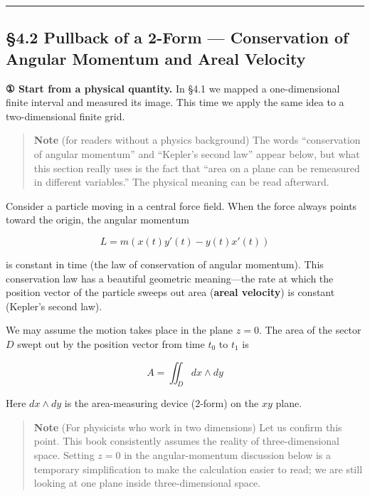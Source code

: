 \begin{center}\rule{0.5\linewidth}{0.5pt}\end{center}

\hypertarget{pullback-of-a-2-form-conservation-of-angular-momentum-and-areal-velocity}{%
\subsection{§4.2 Pullback of a 2-Form --- Conservation of Angular
Momentum and Areal
Velocity}\label{pullback-of-a-2-form-conservation-of-angular-momentum-and-areal-velocity}}

\textbf{① Start from a physical quantity.} In §4.1 we mapped a
one-dimensional finite interval and measured its image. This time we
apply the same idea to a two-dimensional finite grid.

\begin{quote}
\textbf{Note} (for readers without a physics background) The words
``conservation of angular momentum'' and ``Kepler's second law'' appear
below, but what this section really uses is the fact that ``area on a
plane can be remeasured in different variables.'' The physical meaning
can be read afterward.
\end{quote}

Consider a particle moving in a central force field. When the force
always points toward the origin, the angular momentum

\[
L
=
m\left(x(t)y'(t)-y(t)x'(t)\right)
\]

is constant in time (the law of conservation of angular momentum). This
conservation law has a beautiful geometric meaning---the rate at which
the position vector of the particle sweeps out area
(\textbf{areal velocity}) is constant (Kepler's second law).

We may assume the motion takes place in the plane \(z=0\). The area of
the sector \(D\) swept out by the position vector from time \(t_0\) to
\(t_1\) is

\[A = \iint_D dx \wedge dy\]

Here \(dx \wedge dy\) is the area-measuring device (\(2\)-form) on the
\(xy\) plane.

\begin{quote}
\textbf{Note} (For physicists who work in two dimensions) Let us confirm
this point. This book consistently assumes the reality of
three-dimensional space. Setting \(z=0\) in the angular-momentum
discussion below is a temporary simplification to make the calculation
easier to read; we are still looking at one plane inside
three-dimensional space.
\end{quote}

